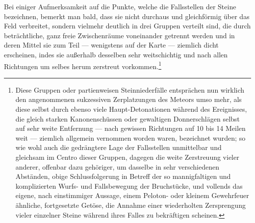 \documentclass[a4paper, 11pt, oneside, german]{article}
\begin{document}
Bei einiger Aufmerksamkeit auf die Punkte, welche die Fallsstellen der Steine bezeichnen, bemerkt man bald, dass sie nicht durchaus und gleichförmig über das Feld verbreitet, sondern vielmehr deutlich in drei Gruppen verteilt sind, die durch beträchtliche, ganz freie Zwischenräume voneinander getrennt werden und in deren Mittel sie zum Teil --- wenigstens auf der Karte --- ziemlich dicht erscheinen, indes sie außerhalb desselben sehr weitschichtig und nach allen Richtungen um selbes herum zerstreut vorkommen.\footnote{Diese Gruppen oder partienweisen Steinniederfälle entsprächen nun wirklich den angenommenen sukzessiven Zerplatzungen des Meteors umso mehr, als diese selbst durch ebenso viele Haupt-Detonationen während des Ereignisses, die gleich starken Kanonenschüssen oder gewaltigen Donnerschlägen selbst auf sehr weite Entfernung --- nach gewissen Richtungen auf 10 bis 14 Meilen weit --- ziemlich allgemein vernommen worden waren, bezeichnet wurden; so wie wohl auch die gedrängtere Lage der Fallsstellen unmittelbar und gleichsam im Centro dieser Gruppen, dagegen die weite Zerstreuung vieler anderer, offenbar dazu gehöriger, um dasselbe in sehr verschiedenen Abständen, obige Schlussfolgerung in Betreff der so mannigfaltigen und komplizierten Wurfs- und Fallsbewegung der Bruchstücke, und vollends das eigene, nach einstimmiger Aussage, einem Peloton- oder kleinem Gewehrfeuer ähnliche, fortgesetzte Getöse, die Annahme einer wiederholten Zersprengung vieler einzelner Steine während ihres Falles zu bekräftigen scheinen.}
\end{document}
